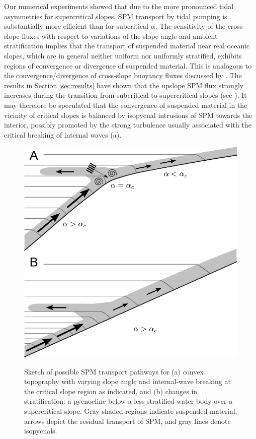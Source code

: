 Our numerical experiments showed that due to the more pronounced tidal
asymmetries for supercritical slopes, SPM transport by tidal pumping
is substantially more efficient than for subcritical $\alpha$. The
sensitivity of the cross-slope fluxes with respect to variations of
the slope angle and ambient stratification implies that the transport
of suspended material near real oceanic slopes, which are in general
neither uniform nor uniformly stratified, exhibits regions of
convergence or divergence of suspended material. This is analogous to
the convergence/divergence of cross-slope buoyancy fluxes discussed by
\cite{Garrett91a}. The results in Section \ref{sec:results} have shown
that the upslope SPM flux strongly increases during the transition
from subcritical to supercritical slopes (see ). It may
therefore be speculated that the convergence of suspended material in
the vicinity of critical slopes is balanced by isopycnal intrusions of
SPM towards the interior, possibly promoted by the strong turbulence
usually associated with the critical breaking of internal waves
(a). 
\begin{figure}[t]
  \noindent\includegraphics[width=30pc,angle=0]{bilder/outlook.pdf}\\
  \caption{Sketch of possible SPM transport pathways for (a) convex
    topography with varying slope angle and internal-wave breaking at
    the critical slope region as indicated, and (b) changes in
    stratification: a pycnocline below a less stratified water body
    over a supercritical slope. Gray-shaded regions indicate suspended
    material, arrows depict the residual transport of SPM, and gray
    lines denote isopycnals. \label{realslopes} }
\end{figure}
